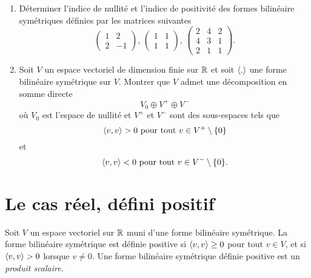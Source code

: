 \begin{enumerate}
\item Déterminer l'indice de nullité et l'indice de positivité des 
formes bilinéaire symétriques 
 définies par les matrices suivantes
  \begin{displaymath}
    \begin{pmatrix}
      1 & 2 \\
      2 & -1
    \end{pmatrix}
    , \,
    \begin{pmatrix}
      1 & 1 \\
      1 & 1
    \end{pmatrix}, \, 
    \begin{pmatrix}
      2 & 4 & 2 \\
      4 & 3 &  1 \\ 
      2 & 1 &1
    \end{pmatrix}. 
  \end{displaymath}

\item Soit $V$ un espace vectoriel de dimension finie sur $\mathbb{R}$ et soit $\langle {.} \rangle$ une forme bilinéaire symétrique  sur $V$.  Montrer que $V$ admet une décomposition en somme directe 
  \begin{displaymath}
    V_0 \oplus V^+ \oplus V^-
  \end{displaymath}
où $V_0$ est l'espace de nullité et $V^+$ et $V^-$ sont des sous-espaces tels que 
\begin{displaymath}
  \langle {v,v} \rangle >0 \text{ pour tout } v \in V^+ \setminus\{0\}
\end{displaymath}
et  
\begin{displaymath}
  \langle {v,v} \rangle <0 \text{ pour tout } v \in V^- \setminus\{0\}. 
\end{displaymath}
\end{enumerate}






\section{Le cas réel, défini positif}
\label{sec:le-case-reel}



\begin{definition}
  \label{def:4}
  Soit $V$ un espace vectoriel sur $\mathbb{R}$ muni 
  d'une forme bilinéaire symétrique. 
  La forme bilinéaire symétrique  est définie positive si $\langle {v,v} \rangle \geq 0$ pour tout $v \in V$, et si $\langle {v,v} \rangle>0$ lorsque $v \neq 0$. Une forme bilinéaire symétrique définie positive est un \emph{produit scalaire}. 
\end{definition}

